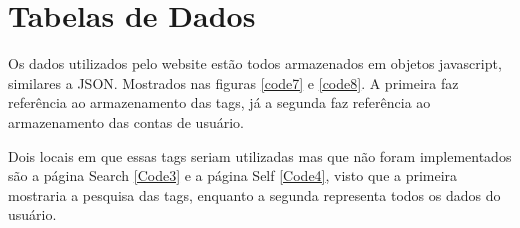 \section{Tabelas de Dados}

    Os dados utilizados pelo website estão todos armazenados em objetos javascript, similares a JSON. Mostrados nas figuras \ref{code7} e \ref{code8}. A primeira faz referência ao armazenamento das tags, já a segunda faz referência ao armazenamento das contas de usuário.

    Dois locais em que essas tags seriam utilizadas mas que não foram implementados são a página Search \ref{Code3} e a página Self \ref{Code4}, visto que a primeira mostraria a pesquisa das tags, enquanto a segunda representa todos os dados do usuário.

